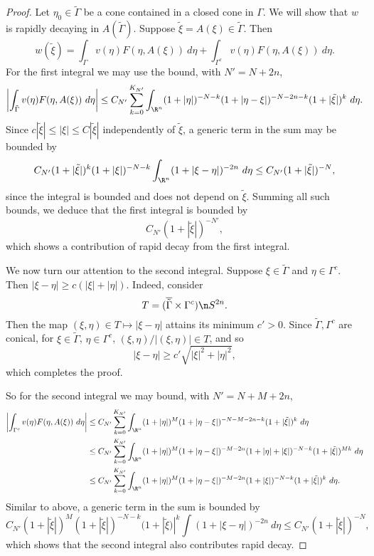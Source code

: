 \documentclass[12pt]{article}
\begin{document}
\begin{proof}
Let $\eta_0 \in \tilde{\Gamma}$ be a cone contained in a closed cone in $\Gamma$. We will show that $w$ is rapidly decaying in $A(\tilde{\Gamma})$. Suppose $\tilde{\xi} =A(\xi) \in \tilde{\Gamma}$. Then
\[w(\tilde{\xi}) = \int_{\Gamma} v(\eta)F(\eta,A(\xi))\ d\eta + \int_{\Gamma^c} v(\eta)F(\eta,A(\xi))\ d\eta.\]
For the first integral we may use the bound, with $N' = N+2n$,
\[\left| \int_{\tilde{\Gamma}} v(\eta)F(\eta,A(\xi))\ d\eta\right| \leq C_{N'}\sum_{k=0}^{K_{N'}}\int_{\R^n}(1+|\eta|)^{-N-k}(1+|\eta-\xi|)^{-N-2n-k}(1+|\tilde{\xi}|)^{k}\ d\eta.\]
Since $c|\tilde{\xi}| \leq |\xi| \leq C|\tilde{\xi}|$ independently of $\tilde{\xi}$, a generic term in the sum may be bounded by
\[C_{N'}(1+|\tilde{\xi}|)^{k}(1+|\xi|)^{-N-k}\int_{\R^n}(1+|\xi-\eta|)^{-2n}\ d\eta \leq C_{N'}(1+|\tilde{\xi}|)^{-N},\]
since the integral is bounded and does not depend on $\tilde{\xi}$. Summing all such bounds, we deduce that the first integral is bounded by
\[C_{N'}(1+|\tilde{\xi}|)^{-N'},\]
which shows a contribution of rapid decay from the first integral.

We now turn our attention to the second integral. Suppose $\xi \in \tilde{\Gamma}$ and $\eta \in \Gamma^c$. Then $|\xi-\eta| \geq c(|\xi|+|\eta|)$. Indeed, consider
\[T = (\overline{\tilde{\Gamma}}\times \Gamma^c) \n S^{2n}.\] Then the map $(\xi,\eta) \in T \mapsto |\xi-\eta|$ attains its minimum $c' > 0$. Since $\tilde{\Gamma}, \Gamma^c$ are conical, for $\xi \in \tilde{\Gamma}$, $\eta \in \Gamma^c$, $(\xi,\eta)/|(\xi,\eta)| \in T$, and so
\[|\xi-\eta| \geq c'\sqrt{|\xi|^2+|\eta|^2},\]
which completes the proof. 

So for the second integral we may bound, with $N' = N+M+2n$,
\begin{align*}
\left|\int_{\Gamma^c} v(\eta)F(\eta,A(\xi))\ d\eta\right| &\leq C_{N'}\sum_{k=0}^{K_{N'}}\int_{\R^n}(1+|\eta|)^M(1+|\eta-\xi|)^{-N-M-2n-k}(1+|\tilde{\xi}|)^{k}\ d\eta \\
&\leq C_{N'}\sum_{k=0}^{K_{N'}}\int_{\R^n}(1+|\eta|)^M(1+|\eta-\xi|)^{-M-2n}(1+|\eta|+|\xi|)^{-N-k}(1+|\tilde{\xi}|)^{Mk}\ d\eta\\
&\leq C_{N'}\sum_{k=0}^{K_{N'}}\int_{\R^n}(1+|\eta|)^M(1+|\eta-\xi|)^{-M-2n}(1+|\xi|)^{-N-k}(1+|\tilde{\xi}|)^{k}\ d\eta.\end{align*} Similar to above, a generic term in the sum is bounded by
\[C_{N'}(1+|\tilde{\xi}|)^{M}(1+|\tilde{\xi}|)^{-N-k}(1+|\tilde{\xi})|^{k}\int (1+|\xi-\eta|)^{-2n}\ d\eta \leq C_{N'}(1+|\tilde{\xi}|)^{-N},\]
which shows that the second integral also contributes rapid decay.\end{proof}
\end{document}
